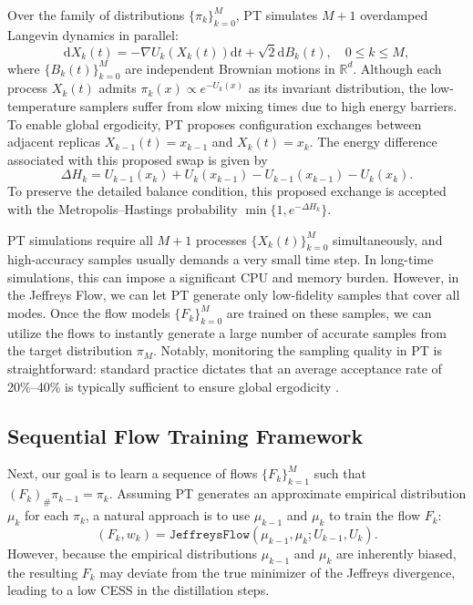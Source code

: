 \documentclass[%
 reprint,
 amsmath,amssymb,
 aps,
 pre,
]{revtex4-2}
\newcommand{\D}{\mathrm{d}}
\newcommand{\Le}{\leqslant}
\begin{document}
Over the family of distributions $\{\pi_k\}_{k=0}^M$, PT simulates $M+1$ overdamped Langevin dynamics in parallel:
\begin{equation*}
	\D X_k(t) = -\nabla U_k(X_k(t))\D t + \sqrt{2}\D B_k(t),
	\quad 0\Le k\Le M,
\end{equation*}
where $\{B_k(t)\}_{k=0}^M$ are independent Brownian motions in $\mathbb R^d$. 
Although each process $X_k(t)$ admits $\pi_k(x) \propto e^{-U_k(x)}$ as its invariant distribution, the low-temperature samplers suffer from slow mixing times due to high energy barriers.
To enable global ergodicity, PT proposes configuration exchanges between adjacent replicas $X_{k-1}(t) = x_{k-1}$ and $X_k(t) = x_k$. The energy difference associated with this proposed swap is given by
\begin{equation*}
	\Delta H_k = U_{k-1}(x_k) + U_k(x_{k-1}) - U_{k-1}(x_{k-1}) - U_k(x_k).
\end{equation*}
To preserve the detailed balance condition, this proposed exchange is accepted with the Metropolis--Hastings probability $\min\{1, e^{-\Delta H_k}\}$.

PT simulations require all $M+1$ processes $\{X_k(t)\}_{k=0}^M$ simultaneously, and high-accuracy samples usually demands a very small time step. In long-time simulations, this can impose a significant CPU and memory burden. However, in the Jeffreys Flow, we can let PT generate only low-fidelity samples that cover all modes. Once the flow models $\{F_k\}_{k=0}^M$ are trained on these samples, we can utilize the flows to instantly generate a large number of accurate samples from the target distribution $\pi_M$. Notably, monitoring the sampling quality in PT is straightforward: standard practice dictates that an average acceptance rate of 20\%--40\% is typically sufficient to ensure global ergodicity \cite{syed2022non}.

\subsection{Sequential Flow Training Framework}

Next, our goal is to learn a sequence of flows $\{F_k\}_{k=1}^M$ such that $(F_k)_\# \pi_{k-1} = \pi_k$. Assuming PT generates an approximate empirical distribution $\mu_k$ for each $\pi_k$, a natural approach is to use $\mu_{k-1}$ and $\mu_k$ to train the flow $F_k$:
\begin{equation*}
	(F_k, w_k) = \mathtt{JeffreysFlow}(\mu_{k-1} , \mu_k ; U_{k-1} , U_k ).
\end{equation*}
However, because the empirical distributions $\mu_{k-1}$ and $\mu_k$ are inherently biased, the resulting $F_k$ may deviate from the true minimizer of the Jeffreys divergence, leading to a low CESS in the distillation steps.
\end{document}
